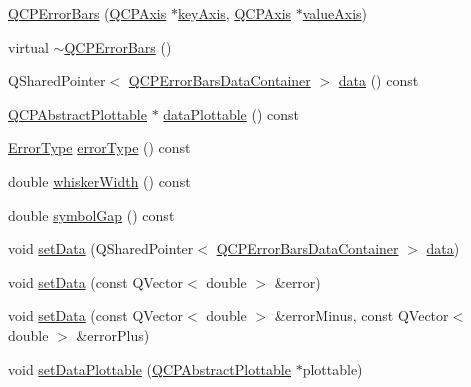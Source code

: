 \begin{DoxyCompactItemize}
\item 
\hyperlink{class_q_c_p_error_bars_a5cdcc33e5f173780c3d657e96216e5c1}{Q\+C\+P\+Error\+Bars} (\hyperlink{class_q_c_p_axis}{Q\+C\+P\+Axis} $\ast$\hyperlink{class_q_c_p_abstract_plottable_a72c7a09c22963f2c943f07112b311103}{key\+Axis}, \hyperlink{class_q_c_p_axis}{Q\+C\+P\+Axis} $\ast$\hyperlink{class_q_c_p_abstract_plottable_a3106f9d34d330a6097a8ec5905e5b519}{value\+Axis})
\item 
virtual \hyperlink{class_q_c_p_error_bars_a7468f8c3dc1cb162d86cf392e938a2e3}{$\sim$\+Q\+C\+P\+Error\+Bars} ()
\item 
Q\+Shared\+Pointer$<$ \hyperlink{qcustomplot_8hh_a8c4472a4da738e0ddbf6b03222c39906}{Q\+C\+P\+Error\+Bars\+Data\+Container} $>$ \hyperlink{class_q_c_p_error_bars_ade69711ef3f9ec10e77d121fa2ba773b}{data} () const 
\item 
\hyperlink{class_q_c_p_abstract_plottable}{Q\+C\+P\+Abstract\+Plottable} $\ast$ \hyperlink{class_q_c_p_error_bars_ad9e85b60a45022c1c3c88dd88693b465}{data\+Plottable} () const 
\item 
\hyperlink{class_q_c_p_error_bars_a95f0220f11a72648b96480a85ce26474}{Error\+Type} \hyperlink{class_q_c_p_error_bars_a05020eba90982b7d1308560edc3ff59f}{error\+Type} () const 
\item 
double \hyperlink{class_q_c_p_error_bars_acb67e100878a60bbe3118baf21d3b2e9}{whisker\+Width} () const 
\item 
double \hyperlink{class_q_c_p_error_bars_a5987a45043d4cc6425438ce2b96b6972}{symbol\+Gap} () const 
\item 
void \hyperlink{class_q_c_p_error_bars_a92b1980003255f5f7c05407a4d92aabc}{set\+Data} (Q\+Shared\+Pointer$<$ \hyperlink{qcustomplot_8hh_a8c4472a4da738e0ddbf6b03222c39906}{Q\+C\+P\+Error\+Bars\+Data\+Container} $>$ \hyperlink{class_q_c_p_error_bars_ade69711ef3f9ec10e77d121fa2ba773b}{data})
\item 
void \hyperlink{class_q_c_p_error_bars_a2f33d68a7ec163b09017dce3d9d3abcc}{set\+Data} (const Q\+Vector$<$ double $>$ \&error)
\item 
void \hyperlink{class_q_c_p_error_bars_aac0cf070b957c11177e91b02bcb433c8}{set\+Data} (const Q\+Vector$<$ double $>$ \&error\+Minus, const Q\+Vector$<$ double $>$ \&error\+Plus)
\item 
void \hyperlink{class_q_c_p_error_bars_aabb42a964cfbf780cd1c79850c7cd989}{set\+Data\+Plottable} (\hyperlink{class_q_c_p_abstract_plottable}{Q\+C\+P\+Abstract\+Plottable} $\ast$plottable)

\end{DoxyCompactItemize}
